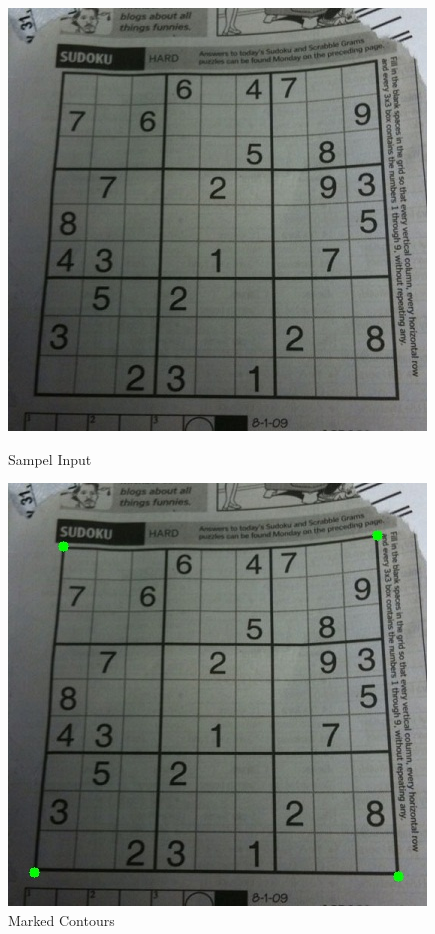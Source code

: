 \documentclass[12pt, a4paper]{report}
\begin{document}
\begin{figure}[!htbp]
    \centering
    \begin{minipage}{0.45\textwidth}
        \centering
        \includegraphics[height=0.7\textwidth]{sample_puzzle.jpg}
        \caption[Sample Input]{\centering Sampel Input}
        \label{fig:7.2}
    \end{minipage}\hfill
    \begin{minipage}{0.45\textwidth}
        \centering
        \includegraphics[height=0.7\textwidth]{puzzle_corners.jpg}
        \caption[Marked Contours]{\centering Marked Contours}
        \label{fig:7.3}
    \end{minipage}
\end{figure}
\vspace*{\fill}
\end{document}
